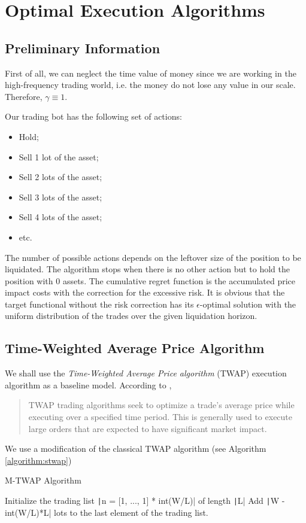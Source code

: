\section{Optimal Execution Algorithms}\label{section:OptExecAlgos}
    \subsection{Preliminary Information}
        First of all, we can neglect the time value of money since we are working in the high-frequency
        trading world, i.e. the money do not lose any value in our scale. Therefore, $\gamma \equiv 1$.

        Our trading bot has the following set of actions:
        \begin{itemize}\label{page:actions}
            \item Hold;
            \item Sell 1 lot of the asset;
            \item Sell 2 lots of the asset;
            \item Sell 3 lots of the asset;
            \item Sell 4 lots of the asset;
            \item etc.
        \end{itemize}
        The number of possible actions depends on the leftover size of the position to be liquidated.
        The algorithm stops when there is no other action but to hold the position with 0 assets. 
        The cumulative regret function is the accumulated price impact costs with the correction for the excessive risk.
        It is obvious that the target functional without the risk correction has its $\epsilon$-optimal 
        solution with the uniform distribution of the trades over the given liquidation horizon.

    \subsection{Time-Weighted Average Price Algorithm}
        We shall use the \emph{Time-Weighted Average Price algorithm} (TWAP) execution algorithm as a baseline model.
        According to \cite{TWAP}, 
        \begin{quote}
            TWAP trading algorithms seek to optimize a trade's average price while executing over a specified time period. This is 
            generally used to execute large orders that are expected to have significant market impact.
        \end{quote}
        We use a modification of the classical TWAP algorithm (see Algorithm \ref{algorithm:stwap})
        \begin{algorithm}
            \caption{M-TWAP Algorithm}
            \begin{algorithmic}
                \State Initialize the trading list \texttt|n = [1, ..., 1] * int(W/L)| of length \texttt|L|
                \State Add \texttt|W - int(W/L)*L| lots to the last element of the trading list.
            \end{algorithmic}
            \label{algorithm:stwap}
        \end{algorithm}

